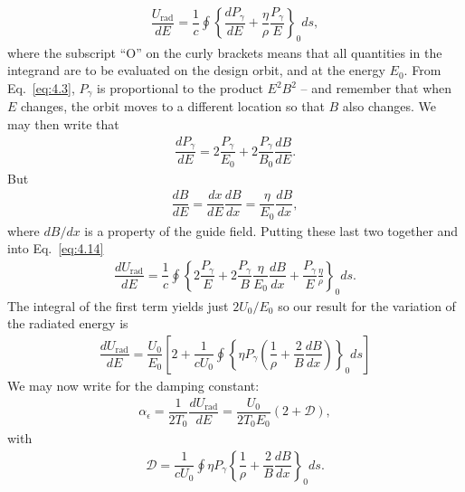 \begin{align} \label{eq:4.14}
	\dfrac{U_\text{rad}}{dE} = \dfrac{1}{c} \oint \left\lbrace \dfrac{dP_\gamma}{dE} + \dfrac{\eta}{\rho} \dfrac{P_\gamma}{E} \right\rbrace_0 ds,
\end{align}
where the subscript ``O'' on the curly brackets means that all quantities in the integrand are to be evaluated on the design orbit, and at the energy $E_0$. From Eq.~\eqref{eq:4.3}, $P_\gamma$ is proportional to the product $E^2 B^2$ -- and remember that when $E$ changes, the orbit moves to a different location so that $B$ also changes. We may then write that
\begin{align*}
	\dfrac{dP_\gamma}{dE} = 2 \dfrac{P_\gamma}{E_0} + 2 \dfrac{P_\gamma}{B_0} \dfrac{dB}{dE}.
\end{align*}
But
\begin{align*}
	\dfrac{dB}{dE} = \dfrac{dx}{dE} \dfrac{dB}{dx} = \dfrac{\eta}{E_0} \dfrac{dB}{dx},
\end{align*}
where $dB/dx$ is a property of the guide field. Putting these last two together and into Eq.~\eqref{eq:4.14}
\begin{align*}
	\dfrac{dU_\text{rad}}{dE} = \dfrac{1}{c} \oint \left\lbrace 2 \dfrac{P_\gamma}{E} + 2 \dfrac{P_\gamma}{B} \dfrac{\eta}{E_0} \dfrac{dB}{dx} + \dfrac{P_\gamma}{E} \frac{\eta}{\rho}  \right\rbrace_0 ds.
\end{align*}
The integral
 of the first
 term yields just $2U_0/E_0$ so our result for the variation of the radiated energy is
\begin{align}
	\dfrac{dU_\text{rad}}{dE} = \dfrac{U_0}{E_0} \left[ 2 + \dfrac{1}{cU_0} \oint \left\lbrace \eta P_\gamma \left( \dfrac{1}{\rho} + \dfrac{2}{B} \dfrac{dB}{dx} \right) \right\rbrace_0 ds \right]
\end{align}
We may now write for the damping constant:
\begin{align}\label{eq:4.16}
\alpha_\epsilon = \dfrac{1}{2 T_0} \dfrac{dU_\text{rad}}{dE} = \dfrac{U_0}{2 T_0 E_0} (2 + \mathscr{D}),
\end{align}
with
\begin{align}
	\mathscr{D} = \dfrac{1}{c U_0} \oint \eta P_\gamma \left\lbrace \dfrac{1}{\rho} + \dfrac{2}{B} \dfrac{dB}{dx} \right\rbrace_0 ds.
\end{align}

